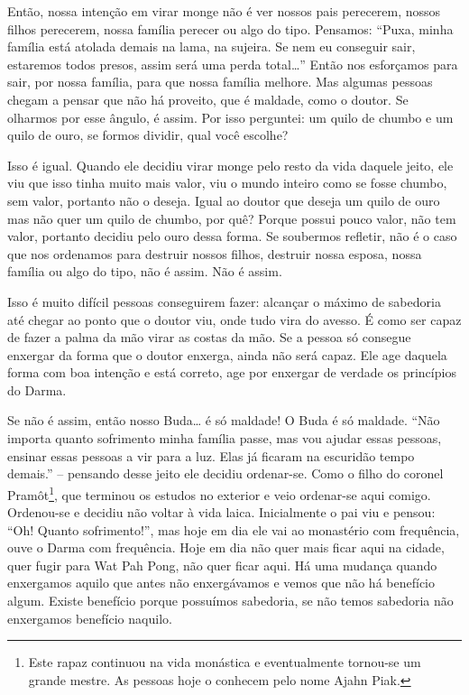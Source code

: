 Então, nossa intenção em virar monge não é ver nossos pais
perecerem, nossos filhos perecerem, nossa família perecer ou algo do
tipo. Pensamos: “Puxa, minha família está atolada demais na lama, na
sujeira. Se nem eu conseguir sair, estaremos todos presos, assim será
uma perda total…” Então nos esforçamos para sair, por nossa família,
para que nossa família melhore. Mas algumas pessoas chegam a pensar que
não há proveito, que é maldade, como o doutor. Se olharmos por esse
ângulo, é assim. Por isso perguntei: um quilo de chumbo e um quilo de
ouro, se formos dividir, qual você escolhe? 

Isso é igual. Quando ele decidiu virar monge pelo resto da vida
daquele jeito, ele viu que isso tinha muito mais valor, viu o mundo
inteiro como se fosse chumbo, sem valor, portanto não o deseja. Igual
ao doutor que deseja um quilo de ouro mas não quer um quilo de chumbo,
por quê? Porque possui pouco valor, não tem valor, portanto decidiu
pelo ouro dessa forma. Se soubermos refletir, não é o caso que nos
ordenamos para destruir nossos filhos, destruir nossa esposa, nossa
família ou algo do tipo, não é assim. Não é assim.

Isso é muito difícil pessoas conseguirem fazer: alcançar o máximo de
sabedoria até chegar ao ponto que o doutor viu, onde tudo vira do
avesso. É como ser capaz de fazer a palma da mão virar as costas da
mão. Se a pessoa só consegue enxergar da forma que o doutor enxerga,
ainda não será capaz. Ele age daquela forma com boa intenção e está
correto, age por enxergar de verdade os princípios do Darma. 

Se não é assim, então nosso Buda… é só maldade! O Buda é só maldade.
“Não importa quanto sofrimento minha família passe, mas vou ajudar
essas pessoas, ensinar essas pessoas a vir para a luz. Elas já ficaram
na escuridão tempo demais.” – pensando desse jeito ele decidiu
ordenar-se. Como o filho do coronel Pramôt\footnote{Este rapaz
continuou na vida monástica e eventualmente tornou-se um grande mestre.
As pessoas hoje o conhecem pelo nome Ajahn Piak.}, que terminou os
estudos no exterior e veio ordenar-se aqui comigo. Ordenou-se e decidiu
não voltar à vida laica. Inicialmente o pai viu e pensou: “Oh! Quanto
sofrimento!”, mas hoje em dia ele vai ao monastério com frequência,
ouve o Darma com frequência. Hoje em dia não quer mais ficar aqui na
cidade, quer fugir para Wat Pah Pong, não quer ficar aqui. Há uma
mudança quando enxergamos aquilo que antes não enxergávamos e vemos que
não há benefício algum. Existe benefício porque possuímos sabedoria, se
não temos sabedoria não enxergamos benefício naquilo. 

